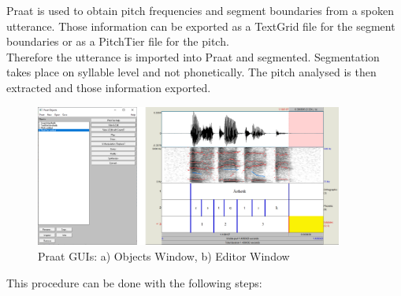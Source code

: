 Praat is used to obtain pitch frequencies and segment boundaries from a spoken utterance. Those information can be exported as a TextGrid file for the segment boundaries or as a PitchTier file for the pitch.\\
Therefore the utterance is imported into Praat and segmented. Segmentation takes place on syllable level and not phonetically. The pitch analysed is then extracted and those information exported. 

\begin{figure}[H]
\centering
\includegraphics[width=0.9\textwidth]{images/3_12.png}
\caption{Praat GUIs: a) Objects Window, b) Editor Window}
\label{3_12}
\end{figure}

This procedure can be done with the following steps:

